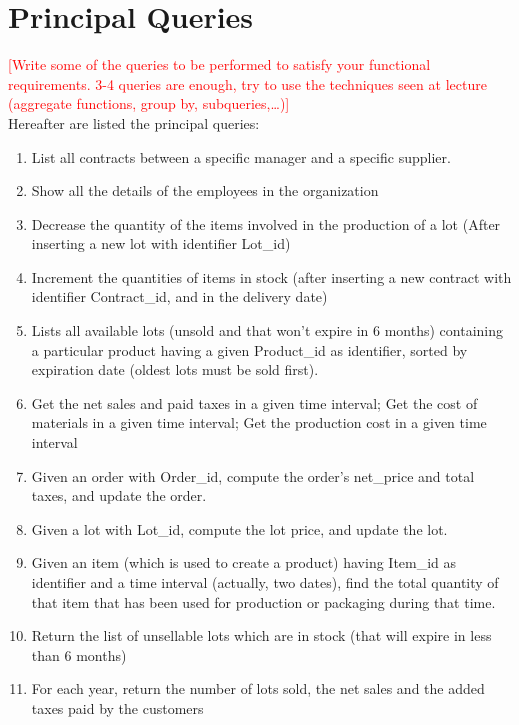 \section{Principal Queries}
\textcolor{red}{[Write some of the queries to be performed to satisfy your functional requirements. 3-4 queries are enough, try to use the techniques seen at lecture (aggregate functions, group by, subqueries,…)]}\\
Hereafter are listed the principal queries:
\begin{enumerate}
    \item List all contracts between a specific manager and a specific supplier.
    \item Show all the details of the employees in the organization
    \item Decrease the quantity of the items involved in the production of a lot (After inserting a new lot with identifier Lot\_id)
    \item Increment the quantities of items in stock (after inserting a new contract with identifier Contract\_id, and in the delivery date)
    \item Lists all available lots (unsold and that won't expire in 6 months) containing a particular product having a given Product\_id as identifier, sorted by expiration date (oldest lots must be sold first).
    \item Get the net sales and paid taxes in a given time interval; Get the cost of materials in a given time interval; Get the production cost in a given time interval
    \item Given an order with Order\_id, compute the order's net\_price and total taxes, and update the order.
    \item Given a lot with Lot\_id, compute the lot price, and update the lot.
    \item Given an item (which is used to create a product) having Item\_id as identifier and a time interval (actually, two dates), find the total quantity of that item that has been used for production or packaging during that time.
    \item Return the list of unsellable lots which are in stock (that will expire in less than 6 months)
    \item For each year, return the number of lots sold, the net sales and the added taxes paid by the customers
\end{enumerate}

